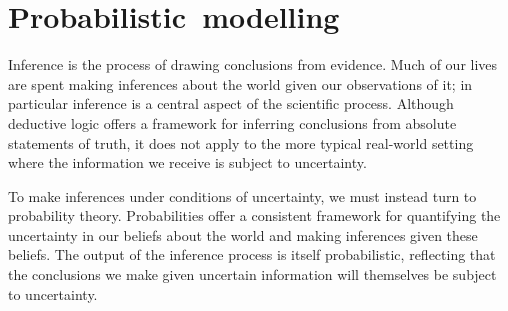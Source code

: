 \chapter{\mbox{Probabilistic modelling}}\label{ch:probabilistic-modelling}

Inference is the process of drawing conclusions from evidence. Much of our lives are spent making inferences about the world given our observations of it; in particular inference is a central aspect of the scientific process. Although deductive logic offers a framework for inferring conclusions from absolute statements of truth, it does not apply to the more typical real-world setting where the information we receive is subject to uncertainty. 

To make inferences under conditions of uncertainty, we must instead turn to probability theory. Probabilities offer a consistent framework for quantifying the uncertainty in our beliefs about the world and making inferences given these beliefs. The output of the inference process is itself probabilistic, reflecting that the conclusions we make given uncertain information will themselves be subject to uncertainty. 


